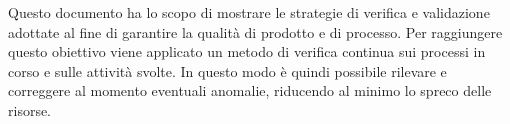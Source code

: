 Questo documento ha lo scopo di mostrare le strategie di verifica e validazione adottate al fine di garantire 
la qualità di prodotto e di processo. Per raggiungere questo obiettivo viene applicato un metodo di verifica continua 
sui processi in corso e sulle attività svolte. In questo modo è quindi possibile rilevare e correggere al momento eventuali 
anomalie, riducendo al minimo lo spreco delle risorse.